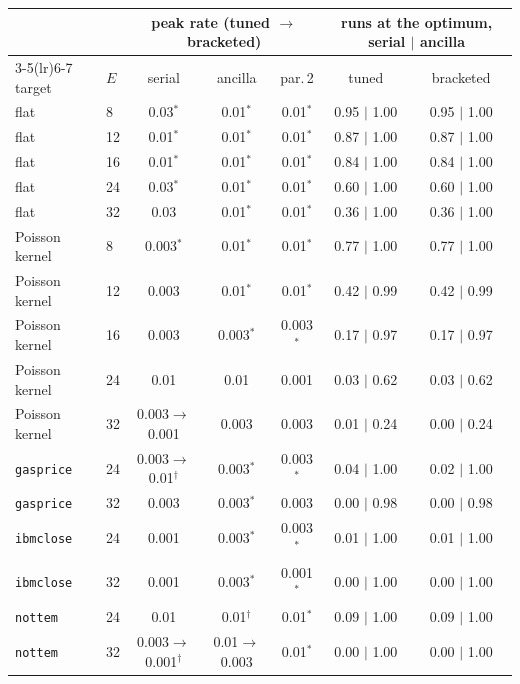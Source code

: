 \begin{tabular}{llccccc}\toprule
 & & \multicolumn{3}{c}{peak rate (tuned $\to$ bracketed)} & \multicolumn{2}{c}{runs at the optimum, serial $|$ ancilla} \\
\cmidrule(lr){3-5}\cmidrule(lr){6-7}
target & $E$ & serial & ancilla & par.\,2 & tuned & bracketed \\\midrule
flat & 8 & 0.03$^\ast$ & 0.01$^\ast$ & 0.01$^\ast$ & 0.95 $|$ 1.00 & 0.95 $|$ 1.00 \\
flat & 12 & 0.01$^\ast$ & 0.01$^\ast$ & 0.01$^\ast$ & 0.87 $|$ 1.00 & 0.87 $|$ 1.00 \\
flat & 16 & 0.01$^\ast$ & 0.01$^\ast$ & 0.01$^\ast$ & 0.84 $|$ 1.00 & 0.84 $|$ 1.00 \\
flat & 24 & 0.03$^\ast$ & 0.01$^\ast$ & 0.01$^\ast$ & 0.60 $|$ 1.00 & 0.60 $|$ 1.00 \\
flat & 32 & 0.03 & 0.01$^\ast$ & 0.01$^\ast$ & 0.36 $|$ 1.00 & 0.36 $|$ 1.00 \\
Poisson kernel & 8 & 0.003$^\ast$ & 0.01$^\ast$ & 0.01$^\ast$ & 0.77 $|$ 1.00 & 0.77 $|$ 1.00 \\
Poisson kernel & 12 & 0.003 & 0.01$^\ast$ & 0.01$^\ast$ & 0.42 $|$ 0.99 & 0.42 $|$ 0.99 \\
Poisson kernel & 16 & 0.003 & 0.003$^\ast$ & 0.003$^\ast$ & 0.17 $|$ 0.97 & 0.17 $|$ 0.97 \\
Poisson kernel & 24 & 0.01 & 0.01 & 0.001 & 0.03 $|$ 0.62 & 0.03 $|$ 0.62 \\
Poisson kernel & 32 & 0.003$\to$0.001 & 0.003 & 0.003 & 0.01 $|$ 0.24 & 0.00 $|$ 0.24 \\
\texttt{gasprice} & 24 & 0.003$\to$0.01$^\dagger$ & 0.003$^\ast$ & 0.003$^\ast$ & 0.04 $|$ 1.00 & 0.02 $|$ 1.00 \\
\texttt{gasprice} & 32 & 0.003 & 0.003$^\ast$ & 0.003 & 0.00 $|$ 0.98 & 0.00 $|$ 0.98 \\
\texttt{ibmclose} & 24 & 0.001 & 0.003$^\ast$ & 0.003$^\ast$ & 0.01 $|$ 1.00 & 0.01 $|$ 1.00 \\
\texttt{ibmclose} & 32 & 0.001 & 0.003$^\ast$ & 0.001$^\ast$ & 0.00 $|$ 1.00 & 0.00 $|$ 1.00 \\
\texttt{nottem} & 24 & 0.01 & 0.01$^\dagger$ & 0.01$^\ast$ & 0.09 $|$ 1.00 & 0.09 $|$ 1.00 \\
\texttt{nottem} & 32 & 0.003$\to$0.001$^\dagger$ & 0.01$\to$0.003 & 0.01$^\ast$ & 0.00 $|$ 1.00 & 0.00 $|$ 1.00 \\
\bottomrule
\end{tabular}
